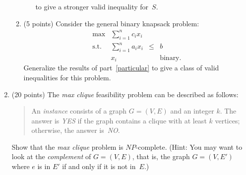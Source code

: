 \begin{enumerate}
\begin{enumerate}
\begin{enumerate}
                 to give a stronger valid inequality for~$S$.
            \end{enumerate}
         \item (5 points)
            Consider the general binary knapsack problem:
            \begin{displaymath}
              \begin{array}{lrcl}
                \max          & \sum_{i=1}^n c_ix_i \\
                \mbox{s.t. }  & \sum_{i=1}^n a_ix_i & \leq & b \\
                              &            x_i  && \mbox{binary.}
              \end{array}
            \end{displaymath}
            Generalize the results of part~\ref{particular} to give a class of
            valid inequalities for this problem.
      \end{enumerate}
   \item (20 points) The {\em max clique} feasibility problem can be described
     as follows:
     \begin{quote}
       An {\em instance} consists of a graph $G=(V,E)$ and an integer $k$.
       The answer is {\em YES} if the graph contains a clique with at
       least $k$ vertices; otherwise, the answer is~{\em NO}.
     \end{quote}
     Show that the {\em max clique} problem is $NP$-complete.
     (Hint: You may want to look at the {\em complement} of $G=(V,E)$,
     that is, the graph $G=(V,E')$ where $e$ is in $E'$ if and only if
     it is not in~$E$.)
\end{enumerate}


